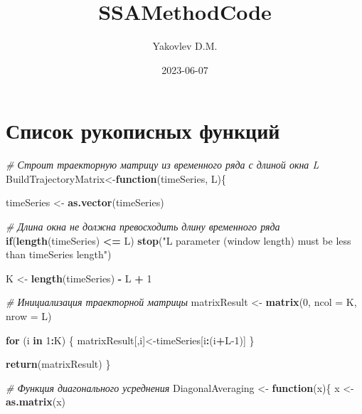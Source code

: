 \documentclass[
]{article}
\title{SSAMethodCode}
\author{Yakovlev D.M.}
\date{2023-06-07}
\newenvironment{Shaded}{\begin{snugshade}}{\end{snugshade}}
\newcommand{\AttributeTok}[1]{\textcolor[rgb]{0.13,0.29,0.53}{#1}}
\newcommand{\CommentTok}[1]{\textcolor[rgb]{0.56,0.35,0.01}{\textit{#1}}}
\newcommand{\ControlFlowTok}[1]{\textcolor[rgb]{0.13,0.29,0.53}{\textbf{#1}}}
\newcommand{\DecValTok}[1]{\textcolor[rgb]{0.00,0.00,0.81}{#1}}
\newcommand{\FunctionTok}[1]{\textcolor[rgb]{0.13,0.29,0.53}{\textbf{#1}}}
\newcommand{\NormalTok}[1]{#1}
\newcommand{\OtherTok}[1]{\textcolor[rgb]{0.56,0.35,0.01}{#1}}
\newcommand{\SpecialCharTok}[1]{\textcolor[rgb]{0.81,0.36,0.00}{\textbf{#1}}}
\newcommand{\StringTok}[1]{\textcolor[rgb]{0.31,0.60,0.02}{#1}}
\begin{document}
\maketitle

\section{Список рукописных
функций}\label{ux441ux43fux438ux441ux43eux43a-ux440ux443ux43aux43eux43fux438ux441ux43dux44bux445-ux444ux443ux43dux43aux446ux438ux439}

\begin{Shaded}
\begin{Highlighting}[]
\CommentTok{\# Строит траекторную матрицу из временного ряда с длиной окна L}
\NormalTok{BuildTrajectoryMatrix}\OtherTok{\textless{}{-}}\ControlFlowTok{function}\NormalTok{(timeSeries, L)\{}

\NormalTok{  timeSeries }\OtherTok{\textless{}{-}} \FunctionTok{as.vector}\NormalTok{(timeSeries)}

  \CommentTok{\# Длина окна не должна превосходить длину временного ряда}
  \ControlFlowTok{if}\NormalTok{(}\FunctionTok{length}\NormalTok{(timeSeries) }\SpecialCharTok{\textless{}=}\NormalTok{ L) }\FunctionTok{stop}\NormalTok{(}\StringTok{"L parameter (window length) must be less than timeSeries length"}\NormalTok{)}


\NormalTok{  K }\OtherTok{\textless{}{-}} \FunctionTok{length}\NormalTok{(timeSeries) }\SpecialCharTok{{-}}\NormalTok{ L }\SpecialCharTok{+} \DecValTok{1}

  \CommentTok{\# Инициализация траекторной матрицы}
\NormalTok{  matrixResult }\OtherTok{\textless{}{-}} \FunctionTok{matrix}\NormalTok{(}\DecValTok{0}\NormalTok{, }\AttributeTok{ncol =}\NormalTok{ K, }\AttributeTok{nrow =}\NormalTok{ L)}

  \ControlFlowTok{for}\NormalTok{ (i }\ControlFlowTok{in} \DecValTok{1}\SpecialCharTok{:}\NormalTok{K) \{}
\NormalTok{    matrixResult[,i]}\OtherTok{\textless{}{-}}\NormalTok{timeSeries[i}\SpecialCharTok{:}\NormalTok{(i}\SpecialCharTok{+}\NormalTok{L}\DecValTok{{-}1}\NormalTok{)]}
\NormalTok{  \}}

  \FunctionTok{return}\NormalTok{(matrixResult)}
\NormalTok{\}}

\CommentTok{\# Функция диагонального усреднения}
\NormalTok{DiagonalAveraging }\OtherTok{\textless{}{-}} \ControlFlowTok{function}\NormalTok{(x)\{}
\NormalTok{  x }\OtherTok{\textless{}{-}} \FunctionTok{as.matrix}\NormalTok{(x)}


\end{Highlighting}
\end{Shaded}
\end{document}
